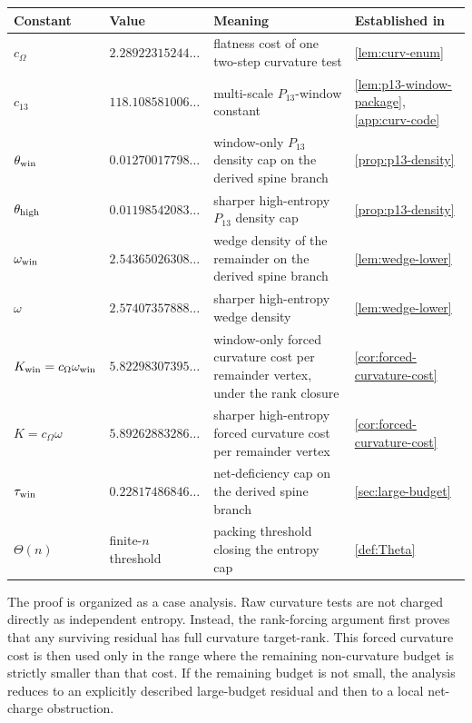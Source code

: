 \documentclass[11pt]{article}
\begin{document}
\begin{center}\small
\begin{tabular}{L{0.17\textwidth} L{0.18\textwidth} L{0.37\textwidth} L{0.18\textwidth}}
\toprule
Constant & Value & Meaning & Established in \\
\midrule
$c_\Omega$ & $2.28922315244\ldots$ & flatness cost of one two-step curvature test & \cref{lem:curv-enum} \\
$c_{13}$ & $118.108581006\ldots$ & multi-scale $P_{13}$-window constant & \cref{lem:p13-window-package}, \cref{app:curv-code} \\
$\theta_{\rm win}$ & $0.01270017798\ldots$ & window-only $P_{13}$ density cap on the derived spine branch & \cref{prop:p13-density} \\
$\theta_{\rm high}$ & $0.01198542083\ldots$ & sharper high-entropy $P_{13}$ density cap & \cref{prop:p13-density} \\
$\omega_{\rm win}$ & $2.54365026308\ldots$ & wedge density of the remainder on the derived spine branch & \cref{lem:wedge-lower} \\
$\omega$ & $2.57407357888\ldots$ & sharper high-entropy wedge density & \cref{lem:wedge-lower} \\
$K_{\rm win}=c_\Omega\omega_{\rm win}$ & $5.82298307395\ldots$ & window-only forced curvature cost per remainder vertex, under the rank closure & \cref{cor:forced-curvature-cost} \\
$K=c_\Omega\omega$ & $5.89262883286\ldots$ & sharper high-entropy forced curvature cost per remainder vertex & \cref{cor:forced-curvature-cost} \\
$\tau_{\rm win}$ & $0.22817486846\ldots$ & net-deficiency cap on the derived spine branch & \cref{sec:large-budget} \\
$\Theta(n)$ & finite-$n$ threshold & packing threshold closing the entropy cap & \cref{def:Theta} \\
\bottomrule
\end{tabular}
\end{center}
The proof is organized as a case analysis.  Raw curvature tests are not charged directly as independent entropy.  Instead, the rank-forcing argument first proves that any surviving residual has full curvature target-rank.  This forced curvature cost is then used only in the range where the remaining non-curvature budget is strictly smaller than that cost.  If the remaining budget is not small, the analysis reduces to an explicitly described large-budget residual and then to a local net-charge obstruction.
\end{document}
